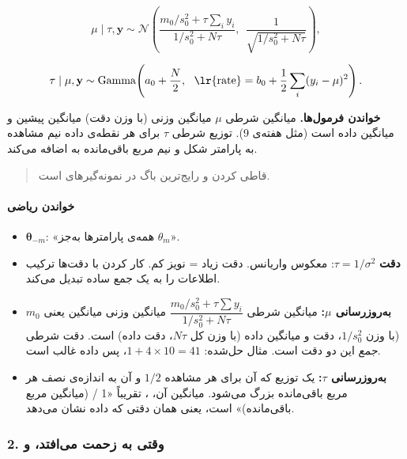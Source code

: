 \[
\mu \mid \tau, \mathbf{y} \sim \mathcal{N}\!\left(\frac{m_0/s_0^2 + \tau \sum_i y_i}{1/s_0^2 + N\tau},\ \ \frac{1}{\sqrt{1/s_0^2 + N\tau}}\right),
\]

\[
\tau \mid \mu, \mathbf{y} \sim \mathrm{Gamma}\!\left(a_0 + \frac{N}{2},\ \ \text{\lr{rate}} = b_0 + \frac12\sum_i (y_i - \mu)^2\right).
\]

\textbf{خواندن فرمول‌ها.} میانگین شرطی \(\mu\) میانگین وزنی (با وزن دقت)
میانگین پیشین و میانگین داده است (مثل  هفته‌ی 9). توزیع
شرطی \(\tau\) برای هر نقطه‌ی داده نیم مشاهده به پارامتر شکل و نیم مربع
باقی‌مانده به  اضافه می‌کند.

\begin{quote}
قاطی کردن  و  رایج‌ترین باگ در نمونه‌گیرهای 
است.
\end{quote}

\paragraph{خواندن ریاضی}

\begin{itemize}
\tightlist
\item
  \(\boldsymbol\theta_{-m}\): «همه‌ی پارامترها به‌جز \(\theta_m\)».
\item
  \textbf{دقت } \(\tau = 1/\sigma^2\): معکوس واریانس.
  دقت زیاد = نویز کم. کار کردن با دقت‌ها ترکیب اطلاعات را به یک جمع ساده
  تبدیل می‌کند.
\item
  \textbf{به‌روزرسانی \(\mu\):} میانگین شرطی
  \(\dfrac{m_0/s_0^2 + \tau\sum y_i}{1/s_0^2 + N\tau}\) میانگین وزنی
  میانگین  یعنی \(m_0\) (با وزن \(1/s_0^2\)، دقت  و
  میانگین داده (با وزن کل \(N\tau\)، دقت داده) است. دقت شرطی \emph{جمع}
  این دو دقت است. مثال حل‌شده: \(1 + 4\times10 = 41\)، پس داده غالب است.
\item
  \textbf{به‌روزرسانی \(\tau\):} یک توزیع  که  آن
  برای هر مشاهده \(1/2\) و  آن به اندازه‌ی نصف هر مربع باقی‌مانده
  بزرگ می‌شود. میانگین آن، ، تقریباً «1 / (میانگین مربع
  باقی‌مانده)» است، یعنی همان دقتی که داده نشان می‌دهد.
\end{itemize}

\subsubsection{\texorpdfstring{2. وقتی  به زحمت می‌افتد، و
}{2. وقتی Gibbs به زحمت می‌افتد، و Metropolis-within-Gibbs}}

